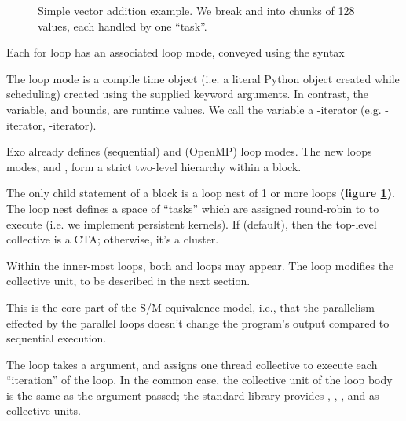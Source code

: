 \filbreak
{}

\begin{figure}[!b]

\caption{Simple vector addition example. We break  and  into chunks of 128 values, each handled by one ``task''.}
\label{fig:intro_tasks_threads}
\end{figure}

Each for loop has an associated loop mode, conveyed using the syntax



The loop mode is a compile time object (i.e. a literal Python object created while scheduling) created using the supplied keyword arguments.
In contrast, the  variable, and  bounds, are runtime values.
We call the  variable a -iterator (e.g. -iterator, -iterator).

\filbreak
Exo already defines  (sequential) and  (OpenMP) loop modes.
The new loops modes,  and , form a strict two-level hierarchy within a  block.

\filbreak
The only child statement of a  block is a loop nest of 1 or more  loops \textbf{(figure \ref{fig:intro_tasks_threads})}.
The loop nest defines a space of ``tasks'' which are assigned round-robin to  to execute (i.e. we implement persistent kernels).
If  (default), then the top-level collective is a CTA; otherwise, it's a cluster.

\filbreak
Within the inner-most  loops, both  and  loops may appear.
The  loop modifies the collective unit, to be described in the next section.

 This is the core part of the S/M equivalence model, i.e., that the parallelism effected by the parallel loops doesn't change the program's output compared to sequential execution.

\filbreak
{}



The  loop takes a  argument, and assigns one thread collective to execute each ``iteration'' of the loop.
In the common case, the collective unit of the loop body is the same as the  argument passed; the standard library provides , , , and  as collective units.

